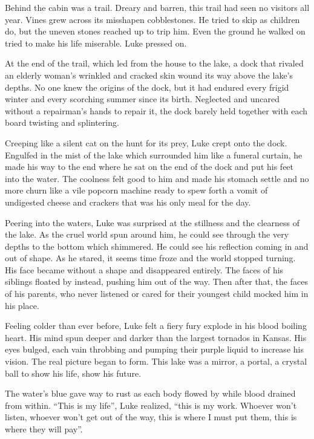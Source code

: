 Behind the cabin was a trail. Dreary and barren, this trail had
seen no visitors all year. Vines grew across its misshapen
cobblestones. He tried to skip as children do, but the uneven
stones reached up to trip him. Even the ground he walked on tried
to make his life miserable. Luke pressed on.



At the end of the trail, which led from the house to the lake, a
dock that rivaled an elderly woman's wrinkled and cracked
skin wound its way above the lake's depths. No one knew the
origins of the dock, but it had endured every frigid winter and
every scorching summer since its birth. Neglected and uncared
without a repairman's hands to repair it, the dock barely
held together with each board twisting and splintering.



Creeping like a silent cat on the hunt for its prey, Luke crept
onto the dock. Engulfed in the mist of the lake which surrounded
him like a funeral curtain, he made his way to the end where he sat
on the end of the dock and put his feet into the water. The
coolness felt good to him and made his stomach settle and no more
churn like a vile popcorn machine ready to spew forth a vomit of
undigested cheese and crackers that was his only meal for the
day.



Peering into the waters, Luke was surprised at the stillness and
the clearness of the lake. As the cruel world spun around him, he
could see through the very depths to the bottom which shimmered. He
could see his reflection coming in and out of shape. As he stared,
it seems time froze and the world stopped turning. His face became
without a shape and disappeared entirely. The faces of his siblings
floated by instead, pushing him out of the way. Then after that,
the faces of his parents, who never listened or cared for their
youngest child mocked him in his place.



Feeling colder than ever before, Luke felt a fiery fury explode in
his blood boiling heart. His mind spun deeper and darker than the
largest tornados in Kansas. His eyes bulged, each vain throbbing
and pumping their purple liquid to increase his vision. The real
picture began to form. This lake was a mirror, a portal, a crystal
ball to show his life, show his future.



The water's blue gave way to rust as each body flowed by
while blood drained from within. ``This is my life'',
Luke realized, ``this is my work. Whoever won't listen,
whoever won't get out of the way, this is where I must put
them, this is where they will pay''.



